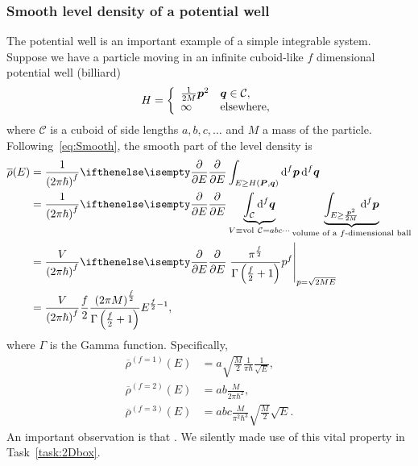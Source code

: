 \documentclass[a4paper,11pt,twoside]{article}
\begin{document}
        \subsubsection{Smooth level density of a potential well}
            The potential well is an important example of a simple integrable system.
            Suppose we have a particle moving in an infinite cuboid-like $f$ dimensional potential well (billiard)
            \begin{equation}
                H=\left\{\begin{array}{ll}
                    \frac{1}{2M}\boldsymbol{p}^{2} & \boldsymbol{q}\in\mathcal{C},\\
                    \infty & \text{elsewhere},
                \end{array}
                \right.
            \end{equation}
            where $\mathcal{C}$ is a cuboid of side lengths $a,b,c,\dotsc$ and $M$ a mass of the particle.
            Following~\eqref{eq:Smooth}, the smooth part of the level density is 
            \begin{align}
                \overline{\rho}(E)
                    &=\frac{1}{\left(2\pi\hbar\right)^{f}}\partialderivative{}{E}
                        \int_{E\geq H(\vector{P},\vector{q})}\d^{f}\vector{p}\,\d^{f}\vector{q}\nonumber\\
                    &=\frac{1}{\left(2\pi\hbar\right)^{f}}\partialderivative{}{E}
                        \underbrace{\int_{\mathcal{C}}\d^{f}\vector{q}}_{V\equiv\mathrm{vol}\ \mathcal{C}=abc\dotsb}
                        \underbrace{\int_{E\geq \frac{\vector{p}^{2}}{2M}}\d^{f}\vector{p}}_{\text{volume of a $f$-dimensional ball}}\nonumber\\
                    &=\frac{V}{\left(2\pi\hbar\right)^{f}}\partialderivative{}{E}
                        \left.\frac{\pi^{\frac{f}{2}}}{\Gamma\left(\frac{f}{2}+1\right)}p^{f}\right|_{p=\sqrt{2ME}}\nonumber\\
                    \label{eq:rhoWell}
                    &=\frac{V}{\left(2\pi\hbar\right)^{f}}\frac{f}{2}\frac{\left(2\pi M\right)^{\frac{f}{2}}}{\Gamma\left(\frac{f}{2}+1\right)}E^{\frac{f}{2}-1},
            \end{align} 
            where $\Gamma$ is the Gamma function.
            Specifically,
            \begin{align}
                \overline{\rho}^{(f=1)}(E)
                    &=a\sqrt{\frac{M}{2}}\frac{1}{\pi\hbar}\frac{1}{\sqrt{E}},\\
                \overline{\rho}^{(f=2)}(E)
                    &=ab\frac{M}{2\pi\hbar^{2}},\\
                \overline{\rho}^{(f=3)}(E)   
                    &=abc\frac{M}{\pi^{2}\hbar^{3}}\sqrt{\frac{M}{2}}\sqrt{E}.
            \end{align}
            An important observation is that .
            We silently made use of this vital property in Task~\ref{task:2Dbox}.
\end{document}
